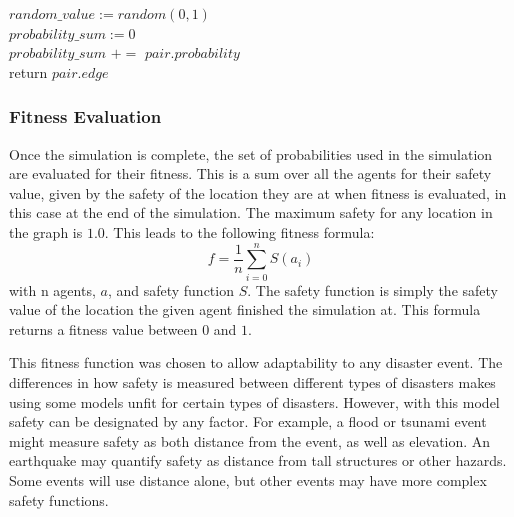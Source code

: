 \documentclass{sig-alternate-05-2015}
\begin{document}
				\begin{algorithm}
					\label{fitness}
					
					$random\_value := random(0, 1)$\\
					$probability\_sum := 0$\\
					{
						$probability\_sum$ $+=$ $pair.probability$\\
						
						{
							return $pair.edge$
						}
					}
					\caption{Selects an edge from set of edges who have probabilties that sum to 1.0. Selects according to the probability distribution \emph{on average}, but is stochastic.}
				\end{algorithm}
			\subsubsection{Fitness Evaluation}
				Once the simulation is complete, the set of probabilities used in the simulation are evaluated for their fitness. This is a sum over all the agents for their safety value, given by the safety of the location they are at when fitness is evaluated, in this case at the end of the simulation. The maximum safety for any location in the graph is $1.0$. This leads to the following fitness formula:\\
				\begin{equation}
				f = \frac{1}{n}\sum_{i = 0}^{n} S(a_i)
				\end{equation}
				with n agents, $a$, and safety function $S$. The safety function is simply the safety value of the location the given agent finished the simulation at. This formula returns a fitness value between $0$ and $1$.
				
				This fitness function was chosen to allow adaptability to any disaster event. The differences in how safety is measured between different types of disasters makes using some models unfit for certain types of disasters. However, with this model safety can be designated by any factor. For example, a flood or tsunami event might measure safety as both distance from the event, as well as elevation. An earthquake may quantify safety as distance from tall structures or other hazards. Some events will use distance alone, but other events may have more complex safety functions.
\end{document}
